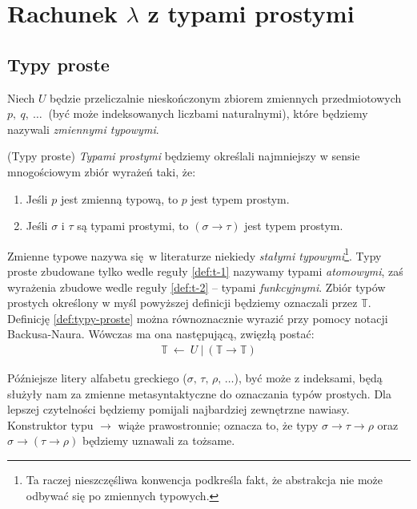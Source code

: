 \section{Rachunek \(\lambda\) z typami prostymi}\label{sec:simple_types}
\subsection{Typy proste}\label{ssec:typy-proste}
Niech \(U\) będzie przeliczalnie nieskończonym zbiorem zmiennych przedmiotowych \(p,\ q,\ \dots\ \) (być może indeksowanych liczbami naturalnymi), które będziemy nazywali \emph{zmiennymi typowymi}.

\begin{definicja}\label{def:typy-proste}(Typy proste)
\emph{Typami prostymi} będziemy określali najmniejszy w sensie mnogościowym zbiór wyrażeń taki, że:
\begin{enumerate}[label=(S\arabic*)]
  \setlength\itemsep{0em}
  \item Jeśli \(p\) jest zmienną typową, to \(p\) jest typem prostym.\label{def:t-1}
  \item Jeśli \(\sigma\) i \(\tau\) są typami prostymi, to \(\left(\sigma\to\tau\right)\) jest typem prostym.\label{def:t-2}
\end{enumerate}
\end{definicja}

Zmienne typowe nazywa się w literaturze niekiedy \emph{stałymi typowymi}\footnote{Ta raczej nieszczęśliwa konwencja podkreśla fakt, że abstrakcja nie może odbywać się po zmiennych typowych.}. Typy proste zbudowane tylko wedle reguły \ref{def:t-1} nazywamy typami \emph{atomowymi}, zaś wyrażenia zbudowe wedle reguły \ref{def:t-2} -- typami \emph{funkcyjnymi}. Zbiór typów prostych określony w myśl powyższej definicji będziemy oznaczali przez \(\mathbb{T}\). Definicję \ref{def:typy-proste} można równoznacznie wyrazić przy pomocy notacji Backusa-Naura. Wówczas ma ona następującą, zwięzłą postać:
\begin{align*}
  \mathbb{T}\ \leftarrow \ U\ |\ (\mathbb{T}\to\mathbb{T})
\end{align*}

Późniejsze litery alfabetu greckiego (\(\sigma,\, \tau,\, \rho,\,\dots\)), być może z indeksami, będą służyły nam za zmienne metasyntaktyczne do oznaczania typów prostych. Dla lepszej czytelności będziemy pomijali najbardziej zewnętrzne nawiasy. Konstruktor typu \(\to\) wiąże prawostronnie; oznacza to, że typy \(\sigma\to\tau\to\rho\) oraz \(\sigma\to(\tau\to\rho)\) będziemy uznawali za tożsame.

